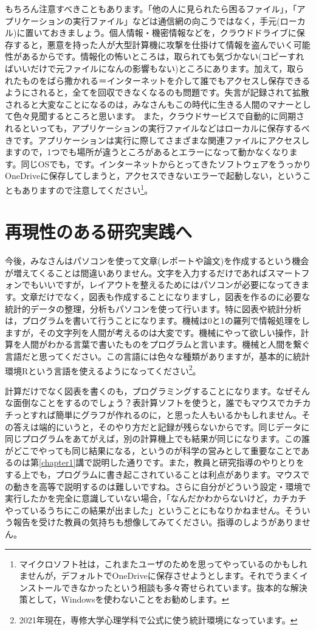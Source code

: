 \documentclass{ltjsbook}
\begin{document}
もちろん注意すべきこともあります。「他の人に見られたら困るファイル」，「アプリケーションの実行ファイル」などは通信網の向こうではなく，手元(ローカル)に置いておきましょう。個人情報・機密情報などを，クラウドドライブに保存すると，悪意を持った人が大型計算機に攻撃を仕掛けて情報を盗んでいく可能性があるからです。情報化の怖いところは，取られても気づかない(コピーすればいいだけで元ファイルになんの影響もない)ところにあります。加えて，取られたものをばら撒かれる＝インターネットを介して誰でもアクセスし保存できるようにされると，全てを回収できなくなるのも問題です。失言が記録されて拡散されると大変なことになるのは，みなさんもこの時代に生きる人間のマナーとして色々見聞するところと思います。
また，クラウドサービスで自動的に同期されるといっても，アプリケーションの実行ファイルなどはローカルに保存するべきです。アプリケーションは実行に際してさまざまな関連ファイルにアクセスしますので，1つでも場所が違うところがあるとエラーになって動かなくなります。同じOSでも，です。インターネットからとってきたソフトウェアをうっかりOneDriveに保存してしまうと，アクセスできないエラーで起動しない，ということもありますので注意してください\footnote{マイクロソフト社は，これまたユーザのためを思ってやっているのかもしれませんが，デフォルトでOneDriveに保存させようとします。それでうまくインストールできなかったという相談も多々寄せられています。抜本的な解決策として，Windowsを使わないことをお勧めします。}。

\section{再現性のある研究実践へ}

今後，みなさんはパソコンを使って文章(レポートや論文)を作成するという機会が増えてくることは間違いありません。文字を入力するだけであればスマートフォンでもいいですが，レイアウトを整えるためにはパソコンが必要になってきます。文章だけでなく，図表も作成することになりますし，図表を作るのに必要な統計的データの整理，分析もパソコンを使って行います。特に図表や統計分析は，プログラムを書いて行うことになります。機械は0と1の羅列で情報処理をしますが，その文字列を人間が考えるのは大変です。機械にやって欲しい操作，計算を人間がわかる言葉で書いたものをプログラムと言います。機械と人間を繋ぐ言語だと思ってください。この言語には色々な種類がありますが，基本的に統計環境Rという言語を使えるようになってください\footnote{2021年現在，専修大学心理学科で公式に使う統計環境になっています。}。

計算だけでなく図表を書くのも，プログラミングすることになります。なぜそんな面倒なことをするのでしょう？表計算ソフトを使うと，誰でもマウスでカチカチっとすれば簡単にグラフが作れるのに，と思った人もいるかもしれません。その答えは端的にいうと，そのやり方だと記録が残らないからです。同じデータに同じプログラムをあてがえば，別の計算機上でも結果が同じになります。この誰がどこでやっても同じ結果になる，というのが科学の営みとして重要なことであるのは第\ref{chapter1}講で説明した通りです。また，教員と研究指導のやりとりをする上でも，プログラムに書き起こされていることは利点があります。マウスでの動きを高等で説明するのは難しいですね。さらに自分がどういう設定・環境で実行したかを完全に意識していない場合，「なんだかわからないけど，カチカチやっているうちにこの結果が出ました」ということにもなりかねません。そういう報告を受けた教員の気持ちも想像してみてください。指導のしようがありません。
\end{document}
